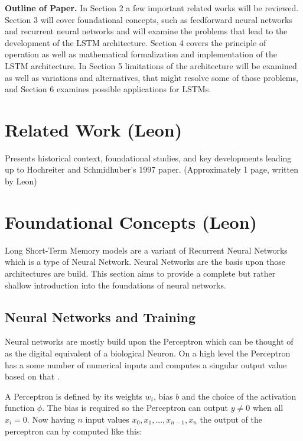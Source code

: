 \documentclass[twoside,a4paper,10pt,DIV=12,BCOR=12mm]{scrartcl}
\begin{document}
\textbf{Outline of Paper.} In Section 2 a few important related works will be reviewed. Section 3 will cover foundational concepts, such as feedforward neural networks and recurrent neural networks and will examine the problems that lead to the development of the LSTM architecture. Section 4 covers the principle of operation as well as mathematical formalization and implementation of the LSTM architecture.  In Section 5 limitations of the architecture will be examined as well as variations and alternatives, that might resolve some of those problems, and Section 6 examines possible applications for LSTMs.\\

\section{Related Work (Leon)}

Presents historical context, foundational studies, and key developments leading up to Hochreiter and Schmidhuber's 1997 paper.
(Approximately 1 page, written by Leon)

\section{Foundational Concepts (Leon)}

Long Short-Term Memory models are a variant of Recurrent Neural Networks which is a type of Neural Network.
Neural Networks are the basis upon those architectures are build. This section aims to
provide a complete but rather shallow introduction into the foundations of neural networks.

\subsection{Neural Networks and Training}

Neural networks are mostly build upon the Perceptron which can be thought of as the digital equivalent of a biological Neuron.
On a high level the Perceptron has a some number of numerical inputs and computes a singular output value based on that \cite{Rosenblatt58}.

A Perceptron is defined by its weights $w_i$, bias $b$ and the choice of the activation function $\phi$.
The bias is required so the Perceptron can output $y \neq 0$ when all $x_i = 0$.
Now having $n$ input values $x_0, x_1, ..., x_{n-1}, x_n$ the output of the perceptron can by computed like this:
\end{document}
